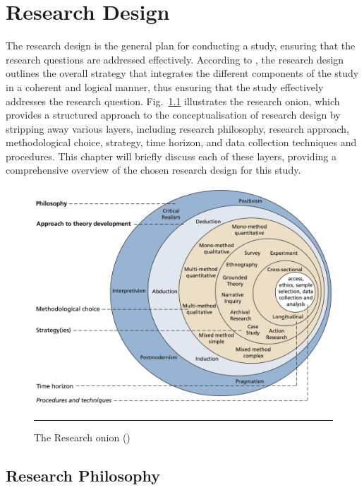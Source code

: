 \chapter{Research Design}\label{chap:research-design}

The research design is the general plan for conducting a study, ensuring that the research questions are addressed effectively.
According to \textcite{SaundersMark2023}, the research design outlines the overall strategy that integrates the different components of the study in a coherent and logical manner, thus ensuring that the study effectively addresses the research question.
Fig.~\ref{fig:research-onion} illustrates the research onion, which provides a structured approach to the conceptualisation of research design by stripping away various layers, including research philosophy, research approach, methodological choice, strategy, time horizon, and data collection techniques and procedures.
This chapter will briefly discuss each of these layers, providing a comprehensive overview of the chosen research design for this study.

\begin{figure}[htbp]
    \centering
 \includegraphics[width=.9\textwidth]{03_Figures/research-methods/research-onion.png}
     \rule{35em}{0.5pt}
    \caption{The Research onion (\textcite{SaundersMark2023})} 
 \label{fig:research-onion}
\end{figure}

\section{Research Philosophy}\label{sec:research-philosophy}

%
